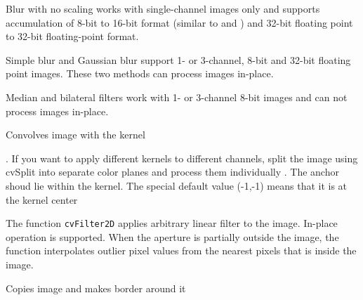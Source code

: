 Blur with no scaling works with single-channel images only and supports accumulation of 8-bit to 16-bit format (similar to  and ) and 32-bit floating point to 32-bit floating-point format.

Simple blur and Gaussian blur support 1- or 3-channel, 8-bit and 32-bit floating point images. These two methods can process images in-place.

Median and bilateral filters work with 1- or 3-channel 8-bit images and can not process images in-place.

\label{Filter2D}

Convolves image with the kernel


\begin{description}
. If you want to apply different kernels to different channels, split the image using cvSplit into separate color planes and process them individually
. The anchor shoud lie within the kernel. The special default value (-1,-1) means that it is at the kernel center
\end{description}

The function \texttt{cvFilter2D} applies arbitrary linear filter to the image. In-place operation is supported. When the aperture is partially outside the image, the function interpolates outlier pixel values from the nearest pixels that is inside the image.

\label{CopyMakeBorder}

Copies image and makes border around it


